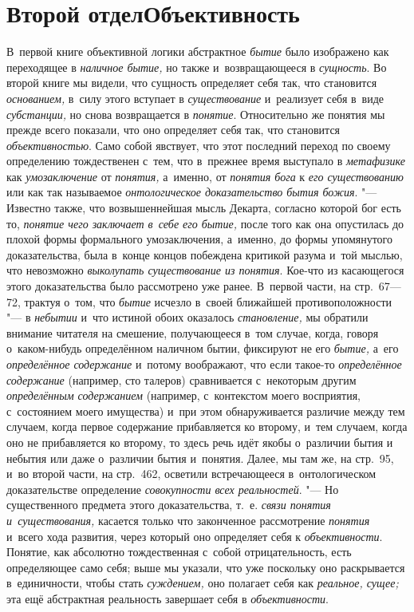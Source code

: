 \bigskip
\clearpage

\part[Второй отдел\newline ОБЪЕКТИВНОСТЬ]{Второй отдел\newline Объективность}

В~первой книге объективной логики абстрактное {\em бытие} было
изображено как переходящее в {\em наличное бытие,} но
также и~возвращающееся в {\em сущность}. Во второй
книге мы видели, что сущность определяет себя так, что становится
{\em основанием,} в~силу этого вступает в {\em существование}
и~реализует себя в~виде {\em субстанции,} но
снова возвращается в {\em понятие}.
Относительно же понятия мы прежде всего показали, что оно
определяет себя так, что становится {\em объективностью}.
Само собой явствует, что этот последний переход по своему
определению тождественен с~тем, что в~прежнее время выступало в
{\em метафизике} как {\em умозаключение} от {\em понятия,} а~именно,
от {\em понятия бога} к {\em его существованию} или как так называемое
{\em онтологическое доказательство бытия
божия}. "--- Известно также, что возвышеннейшая мысль Декарта,
согласно которой бог есть то, {\em понятие чего заключает в~себе его
бытие,} после того как она опустилась до плохой формы
формального умозаключения, а~именно, до формы упомянутого доказательства,
была в~конце концов побеждена критикой разума и~той мыслью, что невозможно
{\em выколупать существование из
понятия}. Кое-что из касающегося этого доказательства было
рассмотрено уже ранее. В~первой части, на стр.~67---72, трактуя о~том, что
{\em бытие} исчезло в~своей ближайшей противоположности "--- в
{\em небытии} и~что истиной обоих оказалось {\em становление,} мы
обратили внимание читателя на смешение, получающееся в~том случае, когда,
говоря о~каком-нибудь определённом наличном бытии, фиксируют не его
{\em бытие,} а~его {\em определённое содержание}
и~потому воображают, что если такое-то {\em определённое содержание}
(например, сто талеров) сравнивается с~некоторым другим
{\em определённым содержанием}
(например, с~контекстом моего восприятия, с~состоянием моего
имущества) и~при этом обнаруживается различие между тем случаем, когда
первое содержание прибавляется ко второму, и~тем случаем, когда оно не
прибавляется ко второму, то здесь речь идёт якобы о~различии бытия и
небытия или даже о~различии бытия и~понятия. Далее, мы там же, на стр.~95,
и~во второй части, на стр.~462, осветили встречающееся в~онтологическом
доказательстве определение {\em совокупности всех реальностей}. "---
Но существенного предмета этого доказательства, т.~е.
{\em связи понятия и~существования,}
касается только что законченное рассмотрение {\em понятия} и~всего
хода развития, через который оно определяет себя к {\em объективности}.
Понятие, как абсолютно тождественная с~собой отрицательность,
есть определяющее само себя; выше мы указали, что уже поскольку оно
раскрывается в~единичности, чтобы стать {\em суждением,} оно
полагает себя как {\em реальное, сущее;} эта ещё
абстрактная реальность завершает себя в {\em объективности}.

